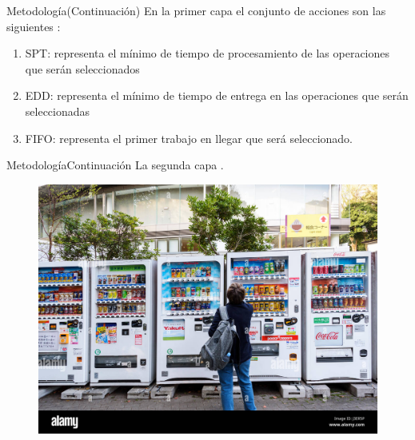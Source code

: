 \documentclass{beamer}
\begin{document}
\begin{frame}{Metodología}{(Continuación)}
	En la primer capa el conjunto de acciones son las siguientes \citep{zhao2019improved}:
	
	\begin{enumerate}
		\item SPT: representa el mínimo de tiempo de procesamiento de las operaciones que serán seleccionados
		\item EDD: representa el mínimo de tiempo de entrega en las operaciones que serán seleccionadas
		\item FIFO: representa el primer trabajo en llegar que será seleccionado.
	\end{enumerate}
\end{frame}

\begin{frame}{Metodología}{Continuación}
	La segunda capa \citep{zhao2019improved}. 
	\begin{figure}
		\centering
		\includegraphics[scale = 0.5]{maquinaaescojer}
	\end{figure}
\end{frame}
\end{document}
